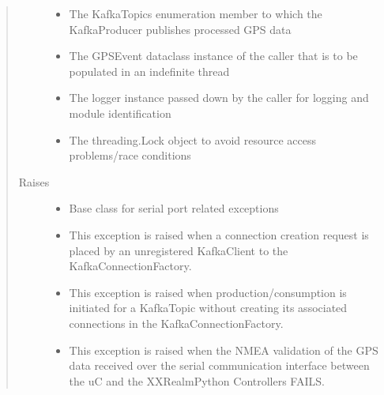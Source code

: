 \documentclass[letterpaper,10pt,english]{sphinxmanual}
\begin{document}
\begin{fulllineitems}
\begin{quote}
\begin{description}
\begin{itemize}
\item {} 
\sphinxAtStartPar
{} \textendash{} The KafkaTopics enumeration member to which the KafkaProducer publishes processed GPS data

\item {} 
\sphinxAtStartPar
{} \textendash{} The GPSEvent dataclass instance of the caller that is to be populated in an indefinite thread

\item {} 
\sphinxAtStartPar
{} \textendash{} The logger instance passed down by the caller for logging and module identification

\item {} 
\sphinxAtStartPar
{} \textendash{} The threading.Lock object to avoid resource access problems/race conditions

\end{itemize}

\item[{Raises}] \leavevmode\begin{itemize}
\item {} 
\sphinxAtStartPar
{} \textendash{} Base class for serial port related exceptions

\item {} 
\sphinxAtStartPar
{\hyperref[\detokenize{Forge:Forge.KafkaClientNotRegisteredError}]{}} \textendash{} This exception is raised when a connection creation request is placed by an
    unregistered KafkaClient to the KafkaConnectionFactory.

\item {} 
\sphinxAtStartPar
{\hyperref[\detokenize{Forge:Forge.KafkaUnknownConnectionError}]{}} \textendash{} This exception is raised when production/consumption is initiated for a KafkaTopic
    without creating its associated connections in the KafkaConnectionFactory.

\item {} 
\sphinxAtStartPar
{\hyperref[\detokenize{Forge:Forge.NMEAValidationError}]{}} \textendash{} This exception is raised when the NMEA validation of the GPS data received over the serial
    communication interface between the uC and the XXRealmPython Controllers FAILS.


\end{itemize}
\end{description}
\end{quote}
\end{fulllineitems}
\end{document}
